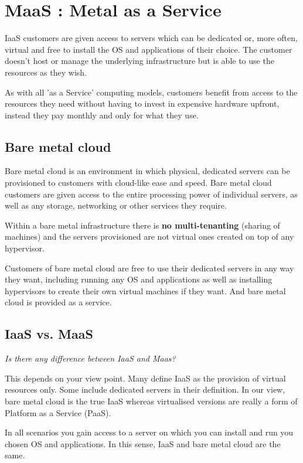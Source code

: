 \chapter{MaaS : Metal as a Service}

IaaS customers are given access to servers which can be dedicated or, more often, virtual and free to install the OS and applications of their choice. The customer doesn't host or manage the underlying infrastructure but is able to use the resources as they wish.

As with all 'as a Service' computing models, customers benefit from access to the resources they need without having to invest in expensive hardware upfront, instead they pay monthly and only for what they use.

\section{Bare metal cloud}

Bare metal cloud is an environment in which physical, dedicated servers can be provisioned to customers with cloud-like ease and speed. Bare metal cloud customers are given access to the entire processing power of individual servers, as well as any storage, networking or other services they require.

Within a bare metal infrastructure there is \textbf{no multi-tenanting} (sharing of machines) and the servers provisioned are not virtual ones created on top of any hypervisor. 

Customers of bare metal cloud are free to use their dedicated servers in any way they want, including running any OS and applications as well as installing hypervisors to create their own virtual machines if they want. And bare metal cloud is provided as a service.

\section{IaaS vs. MaaS}

\textit{Is there any difference between IaaS and Maas?}

This depends on your view point. Many define IaaS as the provision of virtual resources only. Some include dedicated servers in their definition. In our view, bare metal cloud is the true IaaS whereas virtualised versions are really a form of Platform as a Service (PaaS).

In all scenarios you gain access to a server on which you can install and run you chosen OS and applications. In this sense, IaaS and bare metal cloud are the same.

